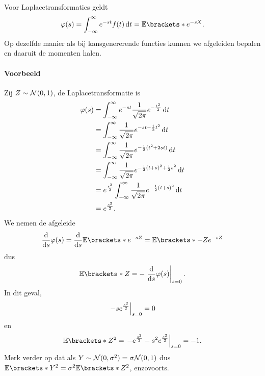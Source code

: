 Voor Laplacetransformaties geldt
\[
    \phi(s) = \int_{-\infty}^\infty e^{-st} f(t) \d t = \E{e^{-sX}}.
\]
Op dezelfde manier als bij kansgenererende functies kunnen we afgeleiden bepalen en daaruit de momenten halen.

\paragraph{Voorbeeld}

Zij $Z \sim \mathcal N(0,1)$, de Laplacetransformatie is
\begin{align*}
    \varphi(s) &= \int_{-\infty}^\infty e^{-st} \frac{1}{\sqrt{2\pi}} e^{-\frac{t^2}{2}} \mathop{}\!\mathrm{d} t \\
    &= \int_{-\infty}^\infty \frac{1}{\sqrt{2 \pi}} e^{-st-\frac 1 2 t^2} \mathop{}\!\mathrm{d} t \\
    &= \int_{-\infty}^\infty \frac{1}{\sqrt{2 \pi}} e^{-\frac 1 2 (t^2 + 2st)} \mathop{}\!\mathrm{d} t \\
    &= \int_{-\infty}^\infty \frac{1}{\sqrt{2 \pi}} e^{- \frac 1 2 (t+s)^2 + \frac 1 2 s^2} \mathop{}\!\mathrm{d} t \\
    &= e^{\frac{s^2}{2}} \int_{-\infty}^\infty \frac{1}{\sqrt{2 \pi}} e^{- \frac 1 2 (t+s)^2} \mathop{}\!\mathrm{d} t \\
    &= e^{\frac{s^2}{2}}.
\end{align*}
We nemen de afgeleide
\[
    \frac{\d}{\d s} \phi (s) = \frac{\d}{\d s} \E{e^{-sZ}} = \E{-Z e^{-sZ}}
\]
dus
\[
    \E{Z} = - \eval{\frac{\d}{\d s} \phi(s)}_{s=0}.
\]
In dit geval,
\[
    \left.-s e^{\frac{s^2}{2}}\right\rvert_{s=0} = 0
\]
en
\[
    \E{Z^2} = \eval{-e^{\frac{s^2}{2}} - s^2 e^{\frac{s^2}{2}}}_{s=0} = -1.
\]
Merk verder op dat als $Y \sim \mathcal N(0,\sigma^2) = \sigma \mathcal N(0,1)$ dus $\E{Y^2} = \sigma^2 \E{Z^2}$, enzovoorts.
